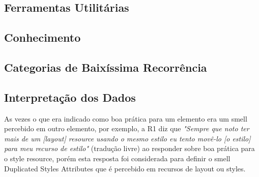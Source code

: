 \subsection{Ferramentas Utilit\'arias}

\subsection{Conhecimento}

\subsection{Categorias de Baix\'issima Recorr\^encia}


\subsection{Interpreta\c{c}\~ao dos Dados}

As vezes o que era indicado como boa pr\'atica para um elemento era um smell percebido em outro elemento, por exemplo, a R1 diz que \textit{"Sempre que noto ter mais de um [layout] resource usando o mesmo estilo eu tento mov\^e-lo [o estilo] para meu recurso de estilo"} (tradu\c{c}\~ao livre) ao responder sobre boa pr\'atica para o style resource, por\'em esta resposta foi considerada para definir o smell Duplicated Styles Attributes que \'e percebido em recursos de layout ou styles.



